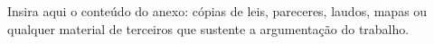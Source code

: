 

Insira aqui o conteúdo do anexo: cópias de leis, pareceres, laudos, mapas ou
qualquer material de terceiros que sustente a argumentação do trabalho.
